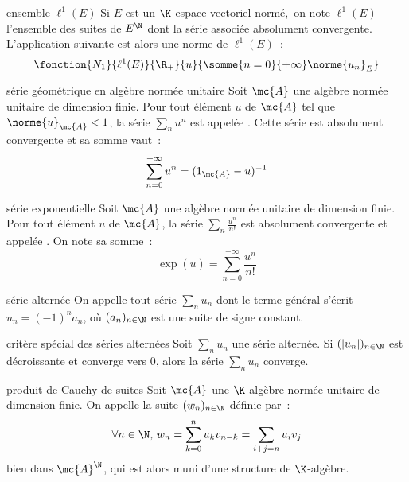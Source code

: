 

\begin{adjustwidth}{-3cm}{-3cm}


\begin{definition}{6.16}{ensemble $\ell^1(E)$}
    Si $E$ est un $\K$-espace vectoriel normé,\, on note $\ell^1(E)$ l'ensemble des suites de $E^\N$ dont la série associée absolument convergente. L'application suivante est alors une norme de $\ell^1(E)$~:
    $$\fonction{N_1}{\ell^1(E)}{\R_+}{u}{\somme{n=0}{+\infty}\norme{u_n}_E}$$
\end{definition}

\begin{definition}{6.19}{série géométrique en algèbre normée unitaire}
    Soit $\mc{A}$ une algèbre normée unitaire de dimension finie. Pour tout élément $u$ de $\mc{A}$ tel que $\norme{u}_{\mc{A}}<1$,  la série $\sum_n u^n$ est appelée . Cette série est absolument convergente et sa somme vaut~:
    $$\sum_{n=0}^{+\infty}u^n = (1_\mc{A} - u)^{-1}$$
\end{definition}

\begin{definition}{6.22}{série exponentielle}
   Soit $\mc{A}$ une algèbre normée unitaire de dimension finie. Pour tout élément $u$ de $\mc{A}$, la série $\displaystyle \sum_{n} \frac{u^n}{n!}$ est absolument convergente et appelée . On note sa somme~:
    $$\exp(u) = \sum_{n=0}^{+\infty}\frac{u^n}{n!}$$
\end{definition}

\begin{definition}{6.26}{série alternée}
    On appelle  tout série $\displaystyle \sum_{n} u_n$ dont le terme général s'écrit $u_n = (-1)^na_n$, où $(a_n)_{n \in \N}$ est une suite de signe constant.
\end{definition}

\begin{theoreme}{6.27}{critère spécial des séries alternées}
    Soit $\displaystyle \sum_{n} u_n$ une série alternée. Si $(|u_n|)_{n \in \N}$ est décroissante et converge vers $0$, alors la série $\displaystyle \sum_{n} u_n$ converge.
\end{theoreme}

\begin{definition}{6.30}{produit de Cauchy de suites}
    Soit $\mc{A}$ une $\K$-algèbre normée unitaire de dimension finie. On appelle  la suite $(w_n)_{n \in \N}$ définie par~:
    $$\forall n \in \N,\, w_n = \sum_{k=0}^{n}u_kv_{n-k} = \sum_{i+j = n}u_i v_j$$
   bien dans $\mc{A}^\N$, qui est alors muni d'une structure de $\K$-algèbre.
\end{definition}


\end{adjustwidth}

